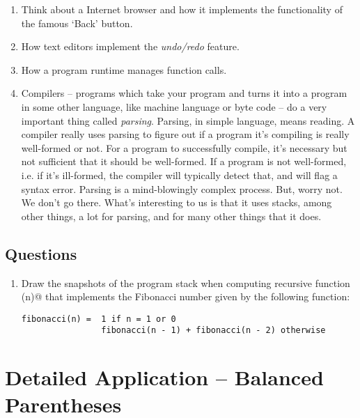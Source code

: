 \documentclass[12pt,a4paper]{article}
\begin{document}
\begin{enumerate}
\item  Think about a Internet browser and how it implements the functionality of the famous `Back' button.

\item How text editors implement the \emph{undo/redo} feature.

\item How a program runtime manages function calls.

\item Compilers -- programs which take your program and turns it into a program in some other language, like machine language or byte code -- do a very important thing called \emph{parsing}. Parsing, in simple language, means reading. A compiler really uses parsing to figure out if a program it's compiling is really well-formed or not. For a program to successfully compile, it's necessary but not sufficient that it should be well-formed. If a program is not well-formed, i.e. if it's ill-formed, the compiler will typically detect that, and will flag a syntax error. Parsing is a mind-blowingly complex process. But, worry not. We don't go there. What's interesting to us is that it uses stacks, among other things, a lot for parsing, and for many other things that it does.

\end{enumerate}

\subsection{Questions}
\begin{enumerate}
\item Draw the snapshots of the program stack when computing recursive function \lstinline@fibonacci(n)@ that implements the \lstinline@n@th Fibonacci number given by the following function:
\begin{lstlisting}
fibonacci(n) =  1 if n = 1 or 0
                fibonacci(n - 1) + fibonacci(n - 2) otherwise
\end{lstlisting}
\end{enumerate}


\section{Detailed Application -- Balanced Parentheses}
\end{document}
